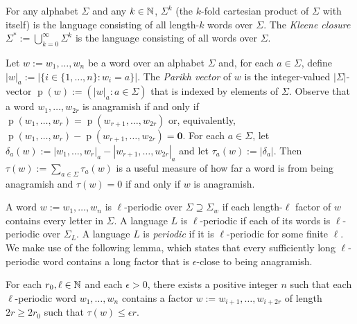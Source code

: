 \documentclass{patmorin}
\DeclareMathOperator{\hist}{p}
\begin{document}
For any alphabet $\Sigma$ and any $k\in\mathbb{N}$, $\Sigma^k$ (the $k$-fold cartesian product of $\Sigma$ with itself) is the language consisting of all length-$k$ words over $\Sigma$.  The \emph{Kleene closure} $\Sigma^*:=\bigcup_{k=0}^\infty \Sigma^k$ is the language consisting of all words over $\Sigma$.


Let $w:=w_1,\ldots,w_n$ be a word over an alphabet $\Sigma$ and, for each $a\in \Sigma$, define $|w|_a:=|\{i\in\{1,\ldots,n\}:w_i=a\}|$.  The \emph{Parikh vector} of $w$ is the integer-valued $|\Sigma|$-vector $\hist(w):=(|w|_{a}:a\in\Sigma)$ that is indexed by elements of $\Sigma$.  Observe that a word $w_1,\ldots,w_{2r}$ is anagramish if and only if $\hist(w_1,\ldots,w_r)=\hist(w_{r+1},\ldots,w_{2r})$ or, equivalently, $\hist(w_1,\ldots,w_r)-\hist(w_{r+1},\ldots,w_{2r})=\boldsymbol{0}$.
For each $a\in\Sigma$, let $\delta_a(w):=|w_1,\ldots,w_r|_{a}-|w_{r+1},\ldots,w_{2r}|_{a}$ and let $\tau_a(w):=|\delta_a|$.
Then $\tau(w):=\sum_{a\in\Sigma}\tau_a(w)$ is a useful measure of how far a word is from being anagramish and $\tau(w)=0$ if and only if $w$ is anagramish.

A word $w:=w_1,\ldots,w_n$ is $\ell$-periodic over $\Sigma\supseteq\Sigma_w$ if each length-$\ell$ factor of $w$ contains every letter in $\Sigma$.  A language $L$ is $\ell$-periodic  if each of its words is $\ell$-periodic over $\Sigma_L$.  A language $L$ is \emph{periodic} if it is $\ell$-periodic for some finite $\ell$.  We make use of the following lemma, which states that every sufficiently long $\ell$-periodic word contains a long factor that is $\epsilon$-close to being anagramish.

\begin{lem}\label{near_anagram_fourier}
    For each $r_0,\ell\in\mathbb{N}$ and each $\epsilon>0$, there exists a positive integer $n$ such that each $\ell$-periodic word $w_1,\ldots,w_n$ contains a factor $w:=w_{i+1},\ldots,w_{i+2r}$ of length $2r \ge 2r_0$ such that $\tau(w)\le \epsilon r$.
\end{lem}
\end{document}
